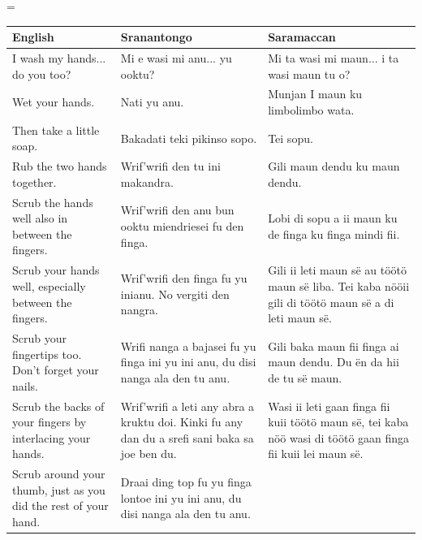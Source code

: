 \LTcapwidth=\textwidth
    \noindent \begin{longtable}{ p{}p{}p{} }
    \hline
        \textbf{English}     &
        \textbf{Sranantongo} &
        \textbf{Saramaccan}  \\
    \hline
        I wash my hands... do you too?             &
        Mi e wasi mi anu... yu ooktu?              &
        Mi ta wasi mi maun... i ta wasi maun tu o? \\
        Wet your hands.                   &
        Nati yu anu.                      &
        Munjan I maun ku limbolimbo wata. \\
        Then take a little soap.     &
        Bakadati teki pikinso sopo.  &
        Tei sopu.                    \\
        Rub the two hands together.      &
        Wrif'wrifi den tu ini makandra.  &
        Gili maun dendu ku maun dendu.   \\
        Scrub the hands well also in between the fingers.        &
        Wrif'wrifi den anu bun ooktu miendriesei fu den finga.   &
        Lobi di sopu a ii maun ku de finga ku finga mindi fii.   \\
        Scrub your hands well, especially between the fingers.                                               &
        Wrif'wrifi den finga fu yu inianu. No vergiti den nangra.                                            &
        Gili ii leti maun së au töötö maun së liba. Tei kaba nööii gili di töötö maun së a di leti maun së.  \\
        Scrub your fingertips too. Don’t forget your nails.                              &
        Wrifi nanga a bajasei fu yu finga ini yu ini anu, du disi nanga ala den tu anu.  &
        Gili baka maun fii finga ai maun dendu. Du ën da hii de tu së maun.              \\
        Scrub the backs of your fingers by interlacing your hands.                                                   &
        Wrif'wrifi a leti any abra a kruktu doi. Kinki fu any dan du a srefi sani baka sa joe ben du.                &
        Wasi ii leti gaan finga fii kuii töötö maun së, tei kaba nöö wasi di töötö gaan finga fii kuii lei maun së.  \\
        Scrub around your thumb, just as you did the rest of your hand.                   &
        Draai ding top fu yu finga lontoe ini yu ini anu, du disi nanga ala den tu anu.   &

\end{longtable}
